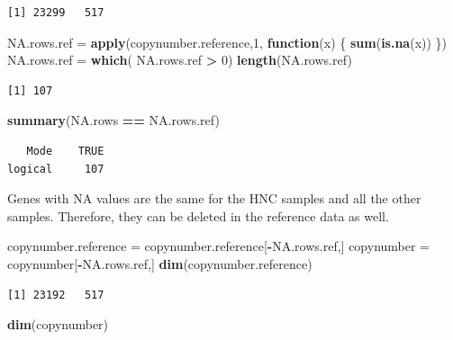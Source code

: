 \documentclass[]{article}
\newenvironment{Shaded}{\begin{snugshade}}{\end{snugshade}}
\newcommand{\KeywordTok}[1]{\textcolor[rgb]{0.13,0.29,0.53}{\textbf{#1}}}
\newcommand{\DecValTok}[1]{\textcolor[rgb]{0.00,0.00,0.81}{#1}}
\newcommand{\StringTok}[1]{\textcolor[rgb]{0.31,0.60,0.02}{#1}}
\newcommand{\ControlFlowTok}[1]{\textcolor[rgb]{0.13,0.29,0.53}{\textbf{#1}}}
\newcommand{\OperatorTok}[1]{\textcolor[rgb]{0.81,0.36,0.00}{\textbf{#1}}}
\newcommand{\NormalTok}[1]{#1}
\begin{document}
\begin{verbatim}
[1] 23299   517
\end{verbatim}

\begin{Shaded}
\begin{Highlighting}[]
\NormalTok{NA.rows.ref =}\StringTok{ }\KeywordTok{apply}\NormalTok{(copynumber.reference,}\DecValTok{1}\NormalTok{, }\ControlFlowTok{function}\NormalTok{(x) \{}
          \KeywordTok{sum}\NormalTok{(}\KeywordTok{is.na}\NormalTok{(x))}
\NormalTok{\})}
\NormalTok{NA.rows.ref =}\StringTok{ }\KeywordTok{which}\NormalTok{( NA.rows.ref }\OperatorTok{>}\StringTok{ }\DecValTok{0}\NormalTok{)}
\KeywordTok{length}\NormalTok{(NA.rows.ref)}
\end{Highlighting}
\end{Shaded}

\begin{verbatim}
[1] 107
\end{verbatim}

\begin{Shaded}
\begin{Highlighting}[]
\KeywordTok{summary}\NormalTok{(NA.rows }\OperatorTok{==}\StringTok{ }\NormalTok{NA.rows.ref)}
\end{Highlighting}
\end{Shaded}

\begin{verbatim}
   Mode    TRUE 
logical     107 
\end{verbatim}

Genes with NA values are the same for the HNC samples and all the other
samples. Therefore, they can be deleted in the reference data as well.

\begin{Shaded}
\begin{Highlighting}[]
\NormalTok{copynumber.reference =}\StringTok{ }\NormalTok{copynumber.reference[}\OperatorTok{-}\NormalTok{NA.rows.ref,]}
\NormalTok{copynumber =}\StringTok{ }\NormalTok{copynumber[}\OperatorTok{-}\NormalTok{NA.rows.ref,]}
\KeywordTok{dim}\NormalTok{(copynumber.reference)}
\end{Highlighting}
\end{Shaded}

\begin{verbatim}
[1] 23192   517
\end{verbatim}

\begin{Shaded}
\begin{Highlighting}[]
\KeywordTok{dim}\NormalTok{(copynumber)}
\end{Highlighting}
\end{Shaded}
\end{document}
